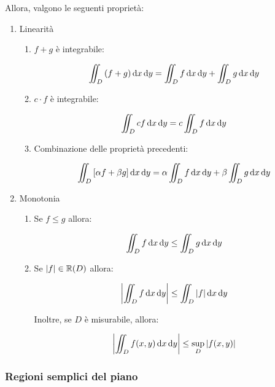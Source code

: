 Allora, valgono le seguenti proprietà:
\begin{enumerate}
    \item Linearità
          \begin{enumerate}
              \item \(f+g\) è integrabile:

                    \[
                        \iint_D {(f+g)} \mathop{}\!\mathrm{d}{x}\mathop{}\!\mathrm{d}{y}  = \iint_D f \mathop{}\!\mathrm{d}{x}\mathop{}\!\mathrm{d}{y} + \iint_D g \mathop{}\!\mathrm{d}{x}\mathop{}\!\mathrm{d}{y}
                    \]
              \item \(c\cdot f\) è integrabile:

                    \[
                        \iint_D {c f} \mathop{}\!\mathrm{d}{x}\mathop{}\!\mathrm{d}{y} = c \iint_D f \mathop{}\!\mathrm{d}{x}\mathop{}\!\mathrm{d}{y}
                    \]

              \item Combinazione delle proprietà precedenti:

                    \[
                        \iint_D {[\alpha f + \beta g ]} \mathop{}\!\mathrm{d}{x}\mathop{}\!\mathrm{d}{y} = \alpha \iint_D f \mathop{}\!\mathrm{d}{x}\mathop{}\!\mathrm{d}{y} + \beta \iint_D g \mathop{}\!\mathrm{d}{x}\mathop{}\!\mathrm{d}{y}
                    \]
          \end{enumerate}

    \item Monotonia
          \begin{enumerate}
              \item Se \(f \le g\) allora:

                    \[
                        \iint_D f \mathop{}\!\mathrm{d}{x}\mathop{}\!\mathrm{d}{y} \le  \iint_D g \mathop{}\!\mathrm{d}{x}\mathop{}\!\mathrm{d}{y}
                    \]
              \item Se \(|f| \in \mathbb{R}(D)\) allora:

                    \[
                        \left|\iint_D f \mathop{}\!\mathrm{d}{x}\mathop{}\!\mathrm{d}{y} \right| \le \iint_D |f| \mathop{}\!\mathrm{d}{x}\mathop{}\!\mathrm{d}{y}
                    \]

                    Inoltre, se \(D\) è misurabile, allora:

                    \[
                        \left|\iint_D f(x,y) \mathop{}\!\mathrm{d}{x}\mathop{}\!\mathrm{d}{y}\right| \le \underset{D}{\sup} \left| f(x,y) \right|
                    \]
          \end{enumerate}
\end{enumerate}

\pagebreak
\subsubsection{Regioni semplici del piano}


